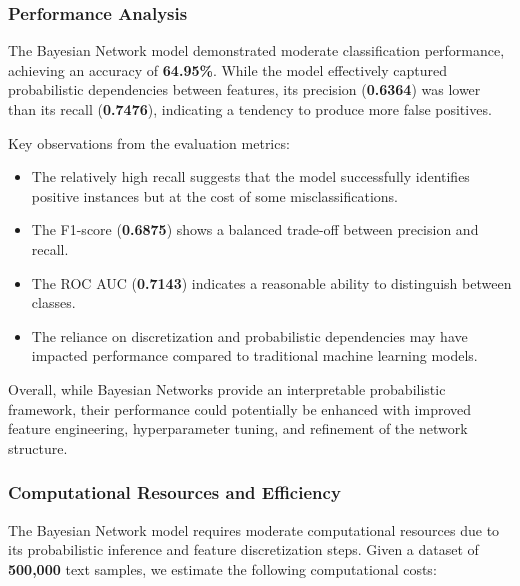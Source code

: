 \subsubsection{Performance Analysis}

The Bayesian Network model demonstrated moderate classification performance, achieving an accuracy of \textbf{64.95\%}. While the model effectively captured probabilistic dependencies between features, its precision (\textbf{0.6364}) was lower than its recall (\textbf{0.7476}), indicating a tendency to produce more false positives.

Key observations from the evaluation metrics:
\begin{itemize}
    \item The relatively high recall suggests that the model successfully identifies positive instances but at the cost of some misclassifications.
    \item The F1-score (\textbf{0.6875}) shows a balanced trade-off between precision and recall.
    \item The ROC AUC (\textbf{0.7143}) indicates a reasonable ability to distinguish between classes.
    \item The reliance on discretization and probabilistic dependencies may have impacted performance compared to traditional machine learning models.
\end{itemize}

Overall, while Bayesian Networks provide an interpretable probabilistic framework, their performance could potentially be enhanced with improved feature engineering, hyperparameter tuning, and refinement of the network structure.

\subsubsection{Computational Resources and Efficiency}

The Bayesian Network model requires moderate computational resources due to its probabilistic inference and feature discretization steps. Given a dataset of \textbf{500,000} text samples, we estimate the following computational costs:


